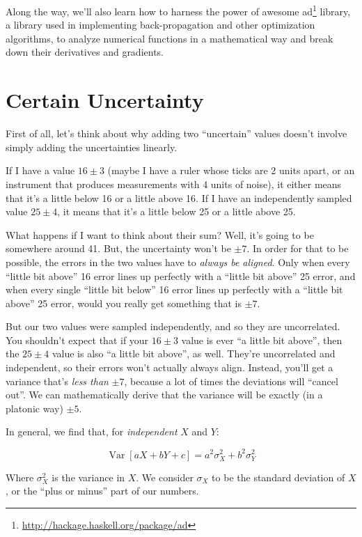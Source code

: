 \documentclass[]{article}
\renewcommand{\href}[2]{#2\footnote{\url{#1}}}
\begin{document}
Along the way, we'll also learn how to harness the power of awesome
\href{http://hackage.haskell.org/package/ad}{ad} library, a library used
in implementing back-propagation and other optimization algorithms, to
analyze numerical functions in a mathematical way and break down their
derivatives and gradients.

\section{Certain Uncertainty}\label{certain-uncertainty}

First of all, let's think about why adding two ``uncertain'' values
doesn't involve simply adding the uncertainties linearly.

If I have a value \(16 \pm 3\) (maybe I have a ruler whose ticks are 2
units apart, or an instrument that produces measurements with 4 units of
noise), it either means that it's a little below 16 or a little above
16. If I have an independently sampled value \(25 \pm 4\), it means that
it's a little below 25 or a little above 25.

What happens if I want to think about their sum? Well, it's going to be
somewhere around 41. But, the uncertainty won't be \(\pm 7\). In order
for that to be possible, the errors in the two values have to
\emph{always be aligned}. Only when every ``little bit above'' 16 error
lines up perfectly with a ``little bit above'' 25 error, and when every
single ``little bit below'' 16 error lines up perfectly with a ``little
bit above'' 25 error, would you really get something that is \(\pm 7\).

But our two values were sampled independently, and so they are
uncorrelated. You shouldn't expect that if your \(16 \pm 3\) value is
ever ``a little bit above'', then the \(25 \pm 4\) value is also ``a
little bit above'', as well. They're uncorrelated and independent, so
their errors won't actually always align. Instead, you'll get a variance
that's \emph{less than} \(\pm 7\), because a lot of times the deviations
will ``cancel out''. We can mathematically derive that the variance will
be exactly (in a platonic way) \(\pm 5\).

In general, we find that, for \emph{independent} \(X\) and \(Y\):

\[
\operatorname{Var}[aX + bY + c] = a^2 \sigma_X^2 + b^2 \sigma_Y^2
\]

Where \(\sigma_X^2\) is the variance in \(X\). We consider \(\sigma_X\)
to be the standard deviation of \(X\), or the ``plus or minus'' part of
our numbers.
\end{document}
